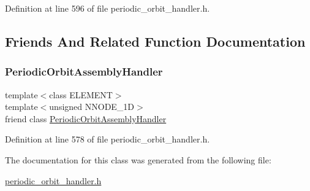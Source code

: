 Definition at line 596 of file periodic\+\_\+orbit\+\_\+handler.\+h.



\subsection{Friends And Related Function Documentation}
\mbox{\label{classoomph_1_1PeriodicOrbitTemporalMesh_a2cbe986bcd27c28d5de7ada068d3d94c}} 
\subsubsection{\texorpdfstring{Periodic\+Orbit\+Assembly\+Handler}{PeriodicOrbitAssemblyHandler}}
{\footnotesize\ttfamily template$<$class E\+L\+E\+M\+E\+NT$>$ \\
template$<$unsigned N\+N\+O\+D\+E\+\_\+1D$>$ \\
friend class \hyperlink{classoomph_1_1PeriodicOrbitAssemblyHandler}{Periodic\+Orbit\+Assembly\+Handler}\hspace{0.3cm}{\ttfamily [friend]}}



Definition at line 578 of file periodic\+\_\+orbit\+\_\+handler.\+h.



The documentation for this class was generated from the following file\+:\begin{DoxyCompactItemize}
\item 
\hyperlink{periodic__orbit__handler_8h}{periodic\+\_\+orbit\+\_\+handler.\+h}\end{DoxyCompactItemize}
